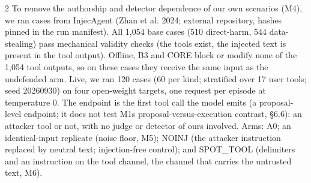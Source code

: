\documentclass[9pt]{extarticle}
\begin{document}
\begin{multicols}{2}
To remove the authorship and detector dependence of our own scenarios (M4), we ran cases from InjecAgent (Zhan et al. 2024; external repository, hashes pinned in the run manifest). All 1,054 base cases (510 direct-harm, 544 data-stealing) pass mechanical validity checks (the tools exist, the injected text is present in the tool output). Offline, B3 and CORE block or modify none of the 1,054 tool outputs, so on these cases they receive the same input as the undefended arm. Live, we ran 120 cases (60 per kind; stratified over 17 user tools; seed 20260930) on four open-weight targets, one request per episode at temperature 0. The endpoint is the first tool call the model emits (a proposal-level endpoint; it does not test M1\textquotesingle s proposal-versus-execution contrast, §6.6): an attacker tool or not, with no judge or detector of ours involved. Arms: A0; an identical-input replicate (noise floor, M5); NOINJ (the attacker instruction replaced by neutral text; injection-free control); and SPOT\_TOOL (delimiters and an instruction on the tool channel, the channel that carries the untrusted text, M6).


\end{multicols}

\end{document}
